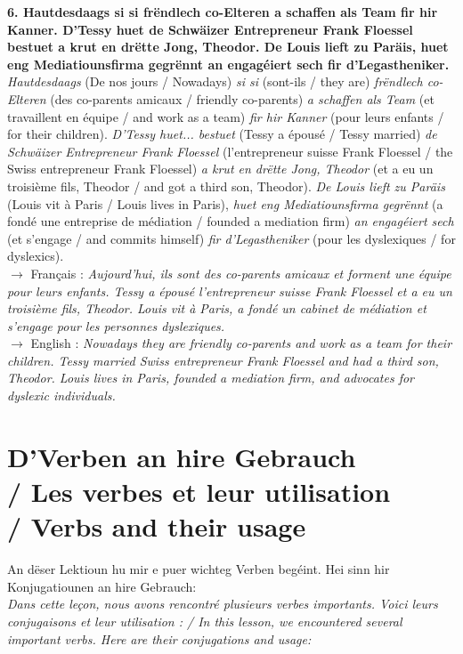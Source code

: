 \noindent\textbf{6. Hautdesdaags si si frëndlech co-Elteren a schaffen als Team fir hir Kanner. D'Tessy huet de Schwäizer Entrepreneur Frank Floessel bestuet a krut en drëtte Jong, Theodor. De Louis lieft zu Paräis, huet eng Mediatiounsfirma gegrënnt an engagéiert sech fir d'Legastheniker.}\\
\textit{Hautdesdaags} (De nos jours / Nowadays) \textit{si si} (sont-ils / they are) \textit{frëndlech co-Elteren} (des co-parents amicaux / friendly co-parents) \textit{a schaffen als Team} (et travaillent en équipe / and work as a team) \textit{fir hir Kanner} (pour leurs enfants / for their children). \textit{D'Tessy huet... bestuet} (Tessy a épousé / Tessy married) \textit{de Schwäizer Entrepreneur Frank Floessel} (l'entrepreneur suisse Frank Floessel / the Swiss entrepreneur Frank Floessel) \textit{a krut en drëtte Jong, Theodor} (et a eu un troisième fils, Theodor / and got a third son, Theodor). \textit{De Louis lieft zu Paräis} (Louis vit à Paris / Louis lives in Paris), \textit{huet eng Mediatiounsfirma gegrënnt} (a fondé une entreprise de médiation / founded a mediation firm) \textit{an engagéiert sech} (et s'engage / and commits himself) \textit{fir d'Legastheniker} (pour les dyslexiques / for dyslexics).\\
$\rightarrow$ Français : \textit{Aujourd'hui, ils sont des co-parents amicaux et forment une équipe pour leurs enfants. Tessy a épousé l'entrepreneur suisse Frank Floessel et a eu un troisième fils, Theodor. Louis vit à Paris, a fondé un cabinet de médiation et s'engage pour les personnes dyslexiques.}\\
$\rightarrow$ English : \textit{Nowadays they are friendly co-parents and work as a team for their children. Tessy married Swiss entrepreneur Frank Floessel and had a third son, Theodor. Louis lives in Paris, founded a mediation firm, and advocates for dyslexic individuals.}\\[0.5em]

\vspace{1cm}

\section[D'Verben an hire Gebrauch / Verbes / Verbs]{D'Verben an hire Gebrauch \\/ Les verbes et leur utilisation \\/ Verbs and their usage}

An dëser Lektioun hu mir e puer wichteg Verben begéint. Hei sinn hir Konjugatiounen an hire Gebrauch: \\
\textit{Dans cette leçon, nous avons rencontré plusieurs verbes importants. Voici leurs conjugaisons et leur utilisation : / In this lesson, we encountered several important verbs. Here are their conjugations and usage:}

